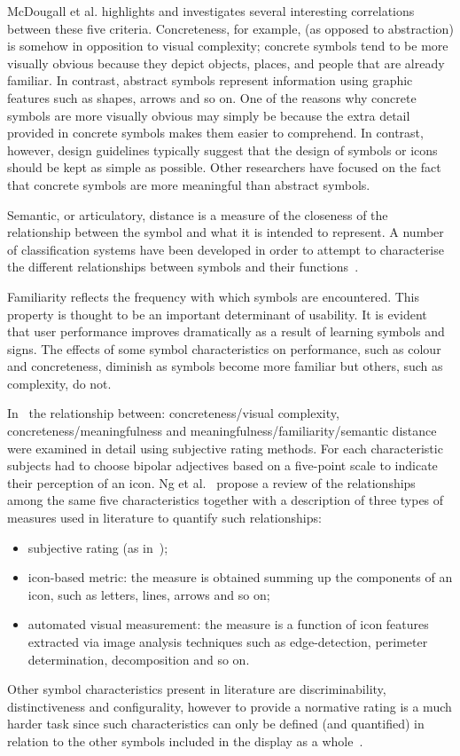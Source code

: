 McDougall et al. highlights and investigates several interesting correlations between these five criteria. 
Concreteness, for example, (as opposed to abstraction) is somehow in opposition to visual complexity; concrete symbols tend to be more visually obvious because they depict objects, places, and people that are already familiar. In contrast, abstract symbols represent information using graphic features such as shapes, arrows and so on. One of the reasons why concrete symbols are more visually
obvious may simply be because the extra detail provided in concrete symbols makes them easier to comprehend. In contrast, however, design guidelines typically suggest
that the design of symbols or icons should be kept as simple as possible.
Other researchers have focused on the fact that concrete symbols are more meaningful than abstract symbols.

Semantic, or articulatory, distance is a measure of the closeness of the relationship between the symbol and what it is intended to represent.
A number of classification systems have been developed in order to attempt to characterise the different
relationships between symbols and their functions~\cite{Peirce1902}.

Familiarity reflects the frequency with which symbols are encountered. This property is thought
to be an important determinant of usability. It is evident that user performance improves dramatically as a result
of learning symbols and signs. 
The effects of some symbol characteristics on performance, such as colour and concreteness, diminish as symbols become
more familiar but others, such as complexity, do not.

In~\cite{Mcdougall2000, Ng2008} the relationship between: concreteness/visual complexity, concreteness/meaningfulness and meaningfulness/familiarity/semantic distance were examined in detail using subjective rating methods. For each characteristic subjects had to choose bipolar adjectives based on a five-point scale to indicate their perception of an icon. 
Ng et al.~\cite{Ng2008} propose a review of the relationships among the same five characteristics together with a description of three types of measures used in literature to quantify such relationships:
\begin{itemize} 
\item subjective rating (as in~\cite{Mcdougall2000}); 
\item icon-based metric: the measure is obtained summing up the components of an icon, such as letters, lines, arrows and so on; 
\item automated visual measurement: the measure is a function of icon features  extracted via image analysis techniques such as edge-detection, perimeter determination, decomposition and so on.
\end{itemize}  
Other symbol characteristics present in literature are discriminability,
distinctiveness and configurality, however to provide a normative rating is a  much harder task since such characteristics can only be defined (and quantified) in relation
to the other symbols included in the display as a whole~\cite{Mcdougall2000}.


